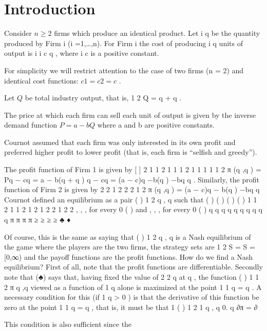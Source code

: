 \documentclass[11pt]{article} %
\begin{document}



\section{Introduction}
 Consider $n \geq 2$ firms which produce
an identical product. Let i q be the quantity produced by Firm i (i =1,…,n). For
Firm i the cost of producing i q units of output is i i c q , where i c is a positive
constant. 

For simplicity we will restrict attention to the case of two firms (n = 2)
and identical cost functions: $c1 = c2 = c$ . 

Let $Q$ be total industry output, that is,
1 2 Q = q + q . 


The price at which each firm can sell each unit of output is given by
the inverse demand function $P = a − bQ$ where a and b are positive constants.

Cournot assumed that each firm was only interested in its own profit and preferred higher profit to lower profit (that is, each firm is “selfish and greedy”). 

The profit function of Firm 1 is given by
[ ] 2
1 1 2 1 1 1 2 1 1 1 1 1 2 π (q ,q ) = Pq − cq = a − b(q + q ) q − cq = (a − c)q −b(q ) −bq q .
Similarly, the profit function of Firm 2 is given by
2
2 1 2 2 2 1 2 π (q ,q ) = (a − c)q − b(q ) −bq q
Cournot defined an equilibrium as a pair ( ) 1 2 q , q such that
( ) ( )
( ) ( )
1 1 2 1 1 2 1
2 1 2 2 1 2 2
, , , for every 0 ( )
and
, , , for every 0 ( )
q q q q q
q q q q q
π π
π π
≥ ≥
≥ ≥
♣
♦

Of course, this is the same as saying that ( ) 1 2 q , q is a Nash equilibrium of the game
where the players are the two firms, the strategy sets are 1 2 S = S = [0,∞) and the
payoff functions are the profit functions. How do we find a Nash equilibrium?
First of all, note that the profit functions are differentiable. Secondly note that (♣)
says that, having fixed the value of 2 2 q at q , the function ( ) 1 1 2 π q ,q viewed as a
function of 1 q alone is maximized at the point 1 1 q = q . A necessary condition for
this (if 1 q > 0 ) is that the derivative of this function be zero at the point 1 1 q = q ,
that is, it must be that 1 ( )
1 2
1
q , q 0.
q
∂π
=
∂

This condition is also sufficient since the
\end{document}
